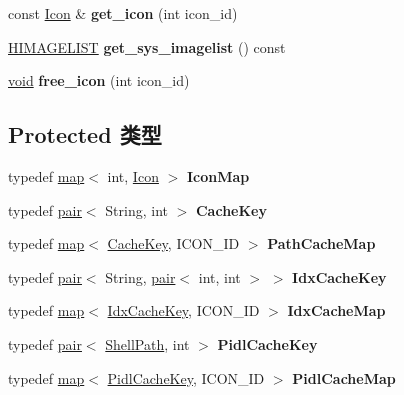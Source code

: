 \begin{DoxyCompactItemize}
\item 
\mbox{\label{struct_icon_cache_ac5a78b7b5bb27ff168ac9807be88d089}} 
const \hyperlink{struct_icon}{Icon} \& {\bfseries get\+\_\+icon} (int icon\+\_\+id)
\item 
\mbox{\label{struct_icon_cache_aeedde35af6a26f587a55b56fe340276e}} 
\hyperlink{struct___i_m_a_g_e_l_i_s_t}{H\+I\+M\+A\+G\+E\+L\+I\+ST} {\bfseries get\+\_\+sys\+\_\+imagelist} () const
\item 
\mbox{\label{struct_icon_cache_ae9547ed3d64eda815eb1f91e36ce176f}} 
\hyperlink{interfacevoid}{void} {\bfseries free\+\_\+icon} (int icon\+\_\+id)
\end{DoxyCompactItemize}
\subsection*{Protected 类型}
\begin{DoxyCompactItemize}
\item 
\mbox{\label{struct_icon_cache_a357988f2144b1507d70ade9714ebc351}} 
typedef \hyperlink{classmap}{map}$<$ int, \hyperlink{struct_icon}{Icon} $>$ {\bfseries Icon\+Map}
\item 
\mbox{\label{struct_icon_cache_a31c57cd9a2c97fa33366e6492377b21c}} 
typedef \hyperlink{structpair}{pair}$<$ String, int $>$ {\bfseries Cache\+Key}
\item 
\mbox{\label{struct_icon_cache_a99611edcdc4294fd36db60933ee66b75}} 
typedef \hyperlink{classmap}{map}$<$ \hyperlink{structpair}{Cache\+Key}, I\+C\+O\+N\+\_\+\+ID $>$ {\bfseries Path\+Cache\+Map}
\item 
\mbox{\label{struct_icon_cache_a1a27db5dcf5f99da8ed634f447fb0ed1}} 
typedef \hyperlink{structpair}{pair}$<$ String, \hyperlink{structpair}{pair}$<$ int, int $>$ $>$ {\bfseries Idx\+Cache\+Key}
\item 
\mbox{\label{struct_icon_cache_ad6b663e3b4d7e4fac9b2dfcb8ece859d}} 
typedef \hyperlink{classmap}{map}$<$ \hyperlink{structpair}{Idx\+Cache\+Key}, I\+C\+O\+N\+\_\+\+ID $>$ {\bfseries Idx\+Cache\+Map}
\item 
\mbox{\label{struct_icon_cache_a5cdeda0231d7949bbee6205e37fb9766}} 
typedef \hyperlink{structpair}{pair}$<$ \hyperlink{struct_shell_path}{Shell\+Path}, int $>$ {\bfseries Pidl\+Cache\+Key}
\item 
\mbox{\label{struct_icon_cache_a6f5a56313aa13267f2b7d34c0dd71fcd}} 
typedef \hyperlink{classmap}{map}$<$ \hyperlink{structpair}{Pidl\+Cache\+Key}, I\+C\+O\+N\+\_\+\+ID $>$ {\bfseries Pidl\+Cache\+Map}
\end{DoxyCompactItemize}
